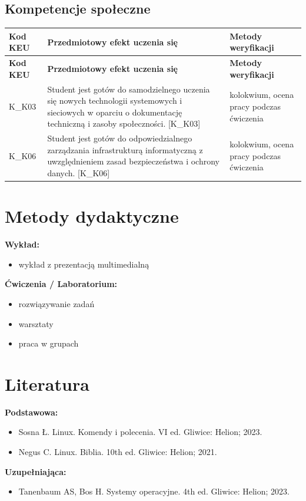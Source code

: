 \documentclass[12pt, a4paper]{article}
\newcommand{\thdrule}{\noalign{\global\setlength{\extrarowheight}{0pt}}}
\newcommand{\thdend}{\noalign{\global\setlength{\extrarowheight}{3pt}}}
\begin{document}
\subsection*{Kompetencje społeczne}
{\scriptsize
\begin{longtable}{m{1.6cm}m{9.0cm}m{4.2cm}}
\thdrule\toprule
\rowcolor{pjatkRed} {\color{white}\footnotesize\textbf{\vphantom{Ag}Kod KEU}} & {\color{white}\footnotesize\textbf{\vphantom{Ag}Przedmiotowy efekt uczenia się}} & {\color{white}\footnotesize\textbf{\vphantom{Ag}Metody weryfikacji}} \\
\midrule\thdend
\endfirsthead
\thdrule\toprule
\rowcolor{pjatkRed} {\color{white}\footnotesize\textbf{\vphantom{Ag}Kod KEU}} & {\color{white}\footnotesize\textbf{\vphantom{Ag}Przedmiotowy efekt uczenia się}} & {\color{white}\footnotesize\textbf{\vphantom{Ag}Metody weryfikacji}} \\
\midrule\thdend
\endhead
  \rowcolor{tableRowLight} K\_K03 & Student jest gotów do samodzielnego uczenia się nowych technologii systemowych i sieciowych w oparciu o dokumentację techniczną i zasoby społeczności. {[}K\_K03{]} & kolokwium, ocena pracy podczas ćwiczenia \\
  \rowcolor{tableRowAlt} K\_K06 & Student jest gotów do odpowiedzialnego zarządzania infrastrukturą informatyczną z uwzględnieniem zasad bezpieczeństwa i ochrony danych. {[}K\_K06{]} & kolokwium, ocena pracy podczas ćwiczenia \\
\bottomrule
\end{longtable}}

\section{Metody dydaktyczne}

\textbf{Wykład:}
\begin{itemize}
  \item wykład z prezentacją multimedialną
\end{itemize}
\vspace{4pt}
\textbf{Ćwiczenia / Laboratorium:}
\begin{itemize}
  \item rozwiązywanie zadań
  \item warsztaty
  \item praca w grupach
\end{itemize}
\vspace{4pt}


\section{Literatura}

\textbf{Podstawowa:}
\begin{itemize}
  \item Sosna Ł. Linux. Komendy i polecenia. VI ed. Gliwice: Helion; 2023.
  \item Negus C. Linux. Biblia. 10th ed. Gliwice: Helion; 2021.
\end{itemize}

\textbf{Uzupełniająca:}
\begin{itemize}
  \item Tanenbaum AS, Bos H. Systemy operacyjne. 4th ed. Gliwice: Helion; 2023.
\end{itemize}
\end{document}
